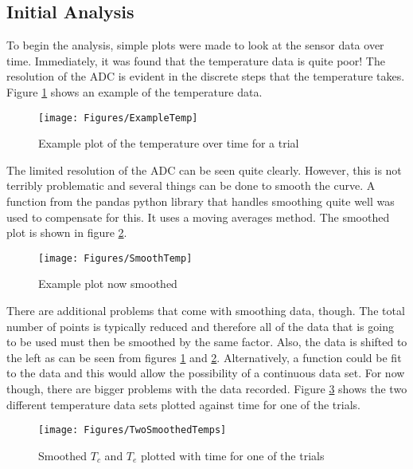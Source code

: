 \subsection{Initial Analysis}
To begin the analysis, simple plots were made to look at the sensor data over time. Immediately, it was found that the temperature data is quite poor! The resolution of the ADC is evident in the discrete steps that the temperature takes. Figure \ref{fig:BadTemp} shows an example of the temperature data.
\begin{figure}[h!]
\centering
\texttt{[image: Figures/ExampleTemp]}
\caption{Example plot of the temperature over time for a trial}
\label{fig:BadTemp}
\end{figure}
The limited resolution of the ADC can be seen quite clearly. However, this is not terribly problematic and several things can be done to smooth the curve. A function from the pandas python library that handles smoothing quite well was used to compensate for this. It uses a moving averages method. The smoothed plot is shown in figure \ref{fig:SmoothedTemp}.
\begin{figure}[h!]
\centering
\texttt{[image: Figures/SmoothTemp]}
\caption{Example plot now smoothed}
\label{fig:SmoothedTemp}
\end{figure}
There are additional problems that come with smoothing data, though. The total number of points is typically reduced and therefore all of the data that is going to be used must then be smoothed by the same factor. Also, the data is shifted to the left as can be seen from figures \ref{fig:BadTemp} and \ref{fig:SmoothedTemp}. Alternatively, a function could be fit to the data and this would allow the possibility of a continuous data set. For now though, there are bigger problems with the data recorded. Figure \ref{fig:BothTemps} shows the two different temperature data sets plotted against time for one of the trials. 
\begin{figure}[h!]
\centering
\texttt{[image: Figures/TwoSmoothedTemps]}
\caption{Smoothed $T_c$ and $T_e$ plotted with time for one of the trials}
\label{fig:BothTemps}
\end{figure}
